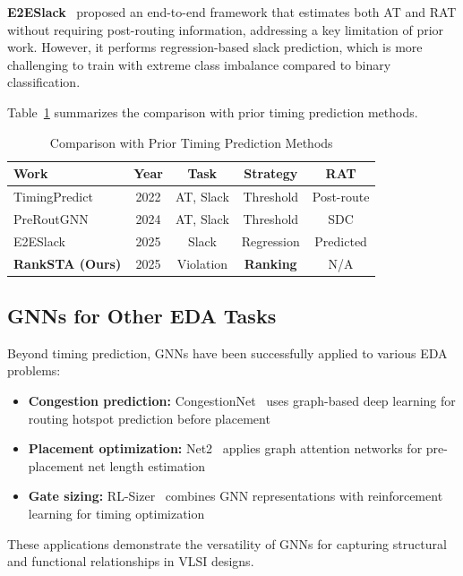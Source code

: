 \documentclass[10pt,twocolumn,journal]{IEEEtran}
\begin{document}
\textbf{E2ESlack}~\cite{bodhe2024e2eslack} proposed an end-to-end framework that estimates both AT and RAT without requiring post-routing information, addressing a key limitation of prior work. However, it performs regression-based slack prediction, which is more challenging to train with extreme class imbalance compared to binary classification.

Table~\ref{tab:relwork} summarizes the comparison with prior timing prediction methods.

\begin{table}[t]
\centering
\caption{Comparison with Prior Timing Prediction Methods}
\label{tab:relwork}
\begin{tabular}{@{}lcccc@{}}
\toprule
\textbf{Work} & \textbf{Year} & \textbf{Task} & \textbf{Strategy} & \textbf{RAT} \\
\midrule
TimingPredict~\cite{guo2022timingpredict} & 2022 & AT, Slack & Threshold & Post-route \\
PreRoutGNN~\cite{zhong2024preroutgnn} & 2024 & AT, Slack & Threshold & SDC \\
E2ESlack~\cite{bodhe2024e2eslack} & 2025 & Slack & Regression & Predicted \\
\textbf{RankSTA (Ours)} & 2025 & Violation & \textbf{Ranking} & N/A \\
\bottomrule
\end{tabular}
\end{table}

\subsection{GNNs for Other EDA Tasks}

Beyond timing prediction, GNNs have been successfully applied to various EDA problems:
\begin{itemize}
    \item \textbf{Congestion prediction:} CongestionNet~\cite{kirby2019congestionnet} uses graph-based deep learning for routing hotspot prediction before placement
    \item \textbf{Placement optimization:} Net2~\cite{xie2021net2} applies graph attention networks for pre-placement net length estimation
    \item \textbf{Gate sizing:} RL-Sizer~\cite{lu2021rlsizer} combines GNN representations with reinforcement learning for timing optimization
\end{itemize}

These applications demonstrate the versatility of GNNs for capturing structural and functional relationships in VLSI designs.
\end{document}
